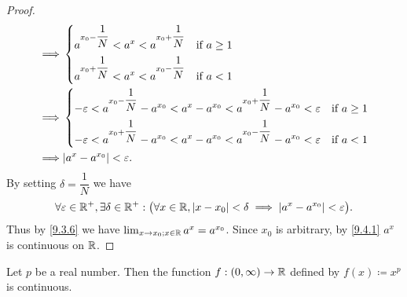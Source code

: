 \begin{proof}
\begin{align*}
    \implies & \begin{dcases}
                 a^{x_0 - \dfrac{1}{N}} < a^{x} < a^{x_0 + \dfrac{1}{N}} & \text{if } a \geq 1 \\
                 a^{x_0 + \dfrac{1}{N}} < a^{x} < a^{x_0 - \dfrac{1}{N}} & \text{if } a < 1
               \end{dcases}                                                          \\
    \implies & \begin{dcases}
                 -\varepsilon < a^{x_0 - \dfrac{1}{N}} - a^{x_0} < a^x - a^{x_0} < a^{x_0 + \dfrac{1}{N}} - a^{x_0} < \varepsilon & \text{if } a \geq 1 \\
                 -\varepsilon < a^{x_0 + \dfrac{1}{N}} - a^{x_0} < a^x - a^{x_0} < a^{x_0 - \dfrac{1}{N}} - a^{x_0} < \varepsilon & \text{if } a < 1
               \end{dcases} \\
    \implies & \abs{a^x - a^{x_0}} < \varepsilon.
  \end{align*}
  By setting \(\delta = \dfrac{1}{N}\) we have
  \[
    \forall \varepsilon \in \mathbb{R}^+, \exists \delta \in \mathbb{R}^+ : \big(\forall x \in \mathbb{R}, \left\lvert x - x_0\right\rvert < \delta \implies \left\lvert a^x - a^{x_0}\right\rvert < \varepsilon\big).
  \]
  Thus by \cref{9.3.6} we have \(\lim_{x \to x_0 ; x \in \mathbb{R}} a^x = a^{x_0}\).
  Since \(x_0\) is arbitrary, by \cref{9.4.1} \(a^x\) is continuous on \(\mathbb{R}\).
\end{proof}

\begin{prop}\label{9.4.11}
  Let \(p\) be a real number.
  Then the function \(f : (0, \infty) \to \mathbb{R}\) defined by \(f(x) \coloneqq x^p\) is continuous.
\end{prop}

